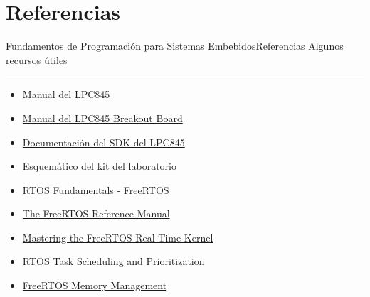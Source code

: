 \documentclass[aspectratio=169, xcolor=dvipsnames]{beamer}
\begin{document}
\section{Referencias}
\begin{frame}{Fundamentos de Programación para Sistemas Embebidos}{Referencias}
    Algunos recursos útiles
    \noindent\rule{\textwidth}{0.75pt}
    \begin{multicols}{2}
    \begin{itemize}
        \item \href{https://github.com/utn-fra-lse/lpc845/blob/main/docs/UM11029.pdf}{Manual del LPC845}
        \item \href{https://github.com/utn-fra-lse/lpc845/blob/main/docs/UM11181.pdf}{Manual del LPC845 Breakout Board}
        \item \href{https://mcuxpresso.nxp.com/api_doc/dev/116/modules.html}{Documentación del SDK del LPC845}
        \item \href{https://github.com/utn-fra-lse/lpc845/blob/main/docs/BASE_KIT_V0.pdf}{Esquemático del kit del laboratorio}
        \item \href{https://www.freertos.org/Documentation/01-FreeRTOS-quick-start/01-Beginners-guide/01-RTOS-fundamentals}{RTOS Fundamentals - FreeRTOS}
        \item \href{https://www.freertos.org/media/2018/FreeRTOS_Reference_Manual_V10.0.0.pdf}{The FreeRTOS Reference Manual}
        \item \href{https://github.com/FreeRTOS/FreeRTOS-Kernel-Book/releases/download/V1.0/Mastering-the-FreeRTOS-Real-Time-Kernel.v1.0.pdf}{Mastering the FreeRTOS Real Time Kernel}
        \item \href{https://www.digikey.ee/en/maker/projects/introduction-to-rtos-solution-to-part-3-task-scheduling/8fbb9e0b0eed4279a2dd698f02ce125f}{RTOS Task Scheduling and Prioritization}
        \item \href{https://www.digikey.com/en/maker/projects/introduction-to-rtos-solution-to-part-4-memory-management/6d4dfcaa1ff84f57a2098da8e6401d9c}{FreeRTOS Memory Management}
    \end{itemize}
    \end{multicols}
\end{frame}
\end{document}

